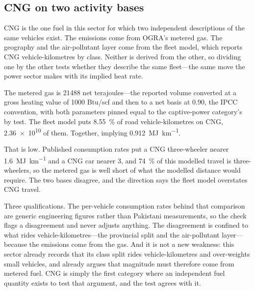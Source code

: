 \subsection{CNG on two activity bases}
\label{sec:cngcheck}

CNG is the one fuel in this sector for which two independent descriptions of the same vehicles
exist. The emissions come from OGRA's metered gas. The geography and the air-pollutant layer
come from the fleet model, which reports CNG vehicle-kilometres by class. Neither is derived
from the other, so dividing one by the other tests whether they describe the same fleet---the
same move the power sector makes with its implied heat rate.

The metered gas is \SI{21488}{} net terajoules---the reported volume converted at a gross
heating value of \SI{1000}{} Btu/scf and then to a net basis at \num{0.90}, the IPCC
convention, with both parameters pinned equal to the captive-power category's by test. The
fleet model puts \SI{8.55}{\percent} of road vehicle-kilometres on CNG, \SI{2.36e10}{} of
them. Together, implying \SI{0.912}{\mega\joule\per\kilo\metre}.

That is low. Published consumption rates put a CNG three-wheeler nearer
\SI{1.6}{\mega\joule\per\kilo\metre} and a CNG car nearer \SI{3}{}, and
\SI{74}{\percent} of this modelled travel is three-wheelers, so the metered gas is well short
of what the modelled distance would require. The two bases disagree, and the direction says the
fleet model overstates CNG travel.

Three qualifications. The per-vehicle consumption rates behind that comparison are generic
engineering figures rather than Pakistani measurements, so the check flags a disagreement and
never adjusts anything. The disagreement is confined to what rides vehicle-kilometres---the
provincial split and the air-pollutant layer---because the emissions come from the gas. And it
is not a new weakness: this sector already records that its class split rides vehicle-kilometres
and over-weights small vehicles, and already argues that magnitude must therefore come from
metered fuel. CNG is simply the first category where an independent fuel quantity exists to test
that argument, and the test agrees with it.
